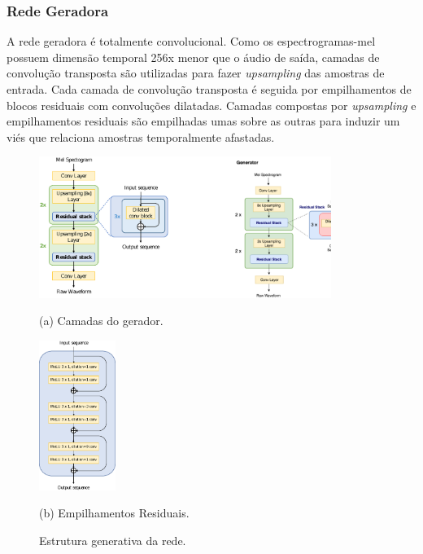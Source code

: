 \documentclass{article}
\begin{document}
\subsubsection{Rede Geradora}

A rede geradora é totalmente convolucional. Como os espectrogramas-mel possuem dimensão temporal 256x menor que o áudio de saída, camadas de convolução transposta são utilizadas para fazer \textit{upsampling} das amostras de entrada. Cada camada de convolução transposta é seguida por empilhamentos de blocos residuais\cite{wavenet} com convoluções dilatadas. Camadas compostas por \textit{upsampling} e empilhamentos residuais são empilhadas umas sobre as outras para induzir um viés que relaciona amostras temporalmente afastadas. 

\begin{figure}[H]
	\begin{minipage}[b]{0.48\linewidth}
		
		{\includegraphics[width=9.5cm]{Figures/gen.eps}}
		\centerline{(a) Camadas do gerador.}\medskip
	\end{minipage}
	\begin{minipage}[b]{.48\linewidth}
		\centering
		\centerline{\includegraphics[width=2.5cm]{Figures/res_stack.eps}}
		\centerline{(b) Empilhamentos Residuais.}\medskip
	\end{minipage}
	\caption{Estrutura generativa da rede.}
	\label{fig:res}
\end{figure}
\end{document}
